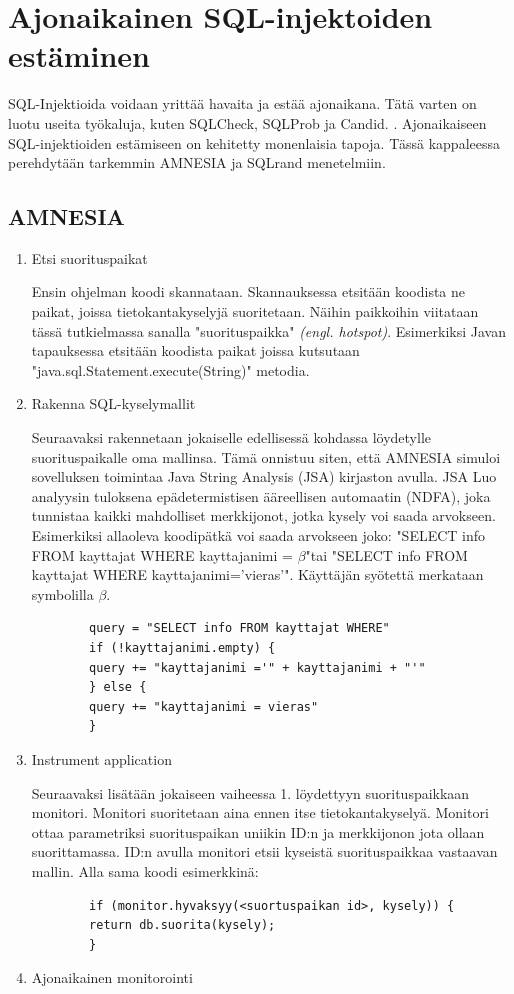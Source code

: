 \documentclass[finnish]{tktltiki2}
\theoremstyle{definition}
\theoremstyle{remark}
\begin{document}
	\section{Ajonaikainen SQL-injektoiden estäminen}
	SQL-Injektioida voidaan yrittää havaita ja estää ajonaikana. Tätä varten on luotu useita työkaluja, kuten SQLCheck, SQLProb ja Candid. \cite{preventions}. Ajonaikaiseen SQL-injektioiden estämiseen on kehitetty monenlaisia tapoja. Tässä kappaleessa perehdytään tarkemmin AMNESIA ja SQLrand menetelmiin.
	
	\subsection{AMNESIA}
	

	\begin{enumerate}
		\item{Etsi suorituspaikat}
		
		Ensin ohjelman koodi skannataan. Skannauksessa etsitään koodista ne paikat, joissa tietokantakyselyjä suoritetaan. Näihin paikkoihin viitataan tässä tutkielmassa sanalla "suorituspaikka" \textit{(engl. hotspot)}. Esimerkiksi Javan tapauksessa etsitään koodista paikat joissa kutsutaan "java.sql.Statement.execute(String)" \space metodia.
		\item{Rakenna SQL-kyselymallit}
		
		Seuraavaksi rakennetaan jokaiselle edellisessä kohdassa löydetylle suorituspaikalle oma mallinsa. Tämä onnistuu siten, että AMNESIA simuloi sovelluksen toimintaa Java String Analysis (JSA) kirjaston avulla. JSA Luo analyysin tuloksena epädetermistisen ääreellisen automaatin (NDFA), joka tunnistaa kaikki mahdolliset merkkijonot, jotka kysely voi saada arvokseen. Esimerkiksi allaoleva koodipätkä voi saada arvokseen joko: 
		"SELECT info FROM kayttajat WHERE kayttajanimi = $\beta$"\space tai "SELECT info FROM kayttajat WHERE kayttajanimi='vieras'". Käyttäjän syötettä merkataan symbolilla $\beta$.
		
		\begin{lstlisting}
		query = "SELECT info FROM kayttajat WHERE"
		if (!kayttajanimi.empty) {
		query += "kayttajanimi ='" + kayttajanimi + "'"
		} else {
		query += "kayttajanimi = vieras"
		}
		\end{lstlisting}
		
		
		\item{Instrument application}
		
		Seuraavaksi lisätään jokaiseen vaiheessa 1. löydettyyn suorituspaikkaan monitori. Monitori suoritetaan aina ennen itse tietokantakyselyä. Monitori ottaa parametriksi suorituspaikan uniikin ID:n ja merkkijonon jota ollaan suorittamassa. ID:n avulla monitori etsii kyseistä suorituspaikkaa vastaavan mallin. Alla sama koodi esimerkkinä: 
		\begin{lstlisting}
		if (monitor.hyvaksyy(<suortuspaikan id>, kysely)) {
		return db.suorita(kysely);
		}
		\end{lstlisting}
		\item{Ajonaikainen monitorointi}
		

\end{enumerate}
\end{document}

